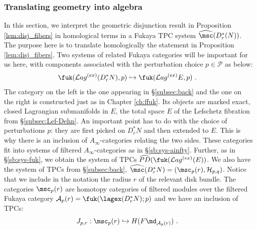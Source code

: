 \subsubsection{Translating geometry into algebra}\label{subsubsec:back_to_alg}
In this section, we interpret the geometric disjunction result in 
Proposition \ref{lem:disj_fibers} in homological terms in
a Fukaya TPC  system $\widehat{\msc}(D^{\ast}_{r}(N))$.
The purpose here is to translate homologically the statement in Proposition \ref{lem:disj_fibers}. 
Two systems of related Fukaya categories will be important for us here, with components associated with the perturbation choice $p\in\mathcal{P}$ as below:
\begin{equation}\label{eq:components_cat}
\fuk(\mathcal{L}ag^{(ex)}(D^{\ast}_{r}N), p)\hookrightarrow \fuk(\mathcal{L}ag^{(ex)}E,p)~.~
\end{equation}
The category on the left is the one appearing in \S\ref{subsec:back} and the one on the right is
constructed just as in Chapter \ref{ch:ffuk}. Its objects are marked exact, closed Lagrangian submanifolds in
$E$, the total space $E$ of the Lefschetz fibration  from \S\ref{subsec:Lef-Dehn}. An important point has to do with the choice of perturbations $p$: they are first picked on $D^{\ast}_{r}N$ and then extended to $E$. This is why there is an inclusion of $A_{\infty}$-categories relating the two sides. These categories fit into systems of filtered $A_{\infty}$-categories as in \S\ref{sb:sys-ainfty}. Further, as in \S\ref{sb:sys-fuk}, we 
obtain the system of TPCs $\widehat{PD}(\fuk(\mathcal{L}ag^{(ex)}(E))$. We also have the system of TPCs from \S\ref{subsec:back}, $\widehat{\msc}(D^{\ast}_{r}N) =(\msc_{p}(r), \mathcal{H}_{p,q})$. Notice that we include in the notation the radius $r$ of the relevant disk bundle. The categories $\msc_{p}(r)$ are homotopy categories of filtered  modules over the filtered Fukaya category $\mathcal{A}_{p}(r)=\fuk(\lagex(D^{\ast}_{r}N); p)$ and we have an inclusion of 
TPCs: $$ J_{p,r}:\msc_{p}(r)\hookrightarrow  H(F\md_{\mathcal{A}_{p}(r)})~.~$$

